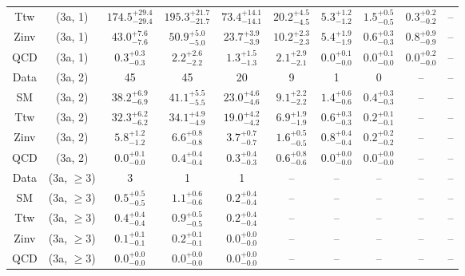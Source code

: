 \begin{table}[h!]
{\begin{tabular}{cccccccccc}
	Ttw & (3a, 1) & $174.5^{+ 29.4 }_{- 29.4 }$ & $195.3^{+ 21.7 }_{- 21.7 }$ & $73.4^{+ 14.1 }_{- 14.1 }$ & $20.2^{+ 4.5 }_{- 4.5 }$ & $5.3^{+ 1.2 }_{- 1.2 }$ & $1.5^{+ 0.5 }_{- 0.5 }$ & $0.3^{+ 0.2 }_{- 0.2 }$ & -- \\[0.5ex] 
	Zinv & (3a, 1) & $43.0^{+ 7.6 }_{- 7.6 }$ & $50.9^{+ 5.0 }_{- 5.0 }$ & $23.7^{+ 3.9 }_{- 3.9 }$ & $10.2^{+ 2.3 }_{- 2.3 }$ & $5.4^{+ 1.9 }_{- 1.9 }$ & $0.6^{+ 0.3 }_{- 0.3 }$ & $0.8^{+ 0.9 }_{- 0.9 }$ & -- \\[0.5ex] 
	QCD & (3a, 1) & $0.3^{+ 0.3 }_{- 0.3 }$ & $2.2^{+ 2.6 }_{- 2.2 }$ & $1.3^{+ 1.5 }_{- 1.3 }$ & $2.1^{+ 2.9 }_{- 2.1 }$ & $0.0^{+ 0.1 }_{- 0.0 }$ & $0.0^{+ 0.1 }_{- 0.0 }$ & $0.0^{+ 0.2 }_{- 0.0 }$ & -- \\[0.5ex] 
	Data & (3a, 2) & 45 & 45 & 20 & 9 & 1 & 0 & -- & -- \\[0.5ex] 
	SM & (3a, 2) & $38.2^{+ 6.9 }_{- 6.9 }$ & $41.1^{+ 5.5 }_{- 5.5 }$ & $23.0^{+ 4.6 }_{- 4.6 }$ & $9.1^{+ 2.2 }_{- 2.2 }$ & $1.4^{+ 0.6 }_{- 0.6 }$ & $0.4^{+ 0.3 }_{- 0.3 }$ & -- & -- \\[0.5ex] 
	Ttw & (3a, 2) & $32.3^{+ 6.2 }_{- 6.2 }$ & $34.1^{+ 4.9 }_{- 4.9 }$ & $19.0^{+ 4.2 }_{- 4.2 }$ & $6.9^{+ 1.9 }_{- 1.9 }$ & $0.6^{+ 0.3 }_{- 0.3 }$ & $0.2^{+ 0.1 }_{- 0.1 }$ & -- & -- \\[0.5ex] 
	Zinv & (3a, 2) & $5.8^{+ 1.2 }_{- 1.2 }$ & $6.6^{+ 0.8 }_{- 0.8 }$ & $3.7^{+ 0.7 }_{- 0.7 }$ & $1.6^{+ 0.5 }_{- 0.5 }$ & $0.8^{+ 0.4 }_{- 0.4 }$ & $0.2^{+ 0.2 }_{- 0.2 }$ & -- & -- \\[0.5ex] 
	QCD & (3a, 2) & $0.0^{+ 0.1 }_{- 0.0 }$ & $0.4^{+ 0.4 }_{- 0.4 }$ & $0.3^{+ 0.4 }_{- 0.3 }$ & $0.6^{+ 0.8 }_{- 0.6 }$ & $0.0^{+ 0.0 }_{- 0.0 }$ & $0.0^{+ 0.0 }_{- 0.0 }$ & -- & -- \\[0.5ex] 
	Data & (3a, $\ge3$) & 3 & 1 & 1 & -- & -- & -- & -- & -- \\[0.5ex] 
	SM & (3a, $\ge3$) & $0.5^{+ 0.5 }_{- 0.5 }$ & $1.1^{+ 0.6 }_{- 0.6 }$ & $0.2^{+ 0.4 }_{- 0.4 }$ & -- & -- & -- & -- & -- \\[0.5ex] 
	Ttw & (3a, $\ge3$) & $0.4^{+ 0.4 }_{- 0.4 }$ & $0.9^{+ 0.5 }_{- 0.5 }$ & $0.2^{+ 0.4 }_{- 0.4 }$ & -- & -- & -- & -- & -- \\[0.5ex] 
	Zinv & (3a, $\ge3$) & $0.1^{+ 0.1 }_{- 0.1 }$ & $0.2^{+ 0.1 }_{- 0.1 }$ & $0.0^{+ 0.0 }_{- 0.0 }$ & -- & -- & -- & -- & -- \\[0.5ex] 
	QCD & (3a, $\ge3$) & $0.0^{+ 0.0 }_{- 0.0 }$ & $0.0^{+ 0.0 }_{- 0.0 }$ & $0.0^{+ 0.0 }_{- 0.0 }$ & -- & -- & -- & -- & -- \\[0.5ex] 

\end{tabular}}
\end{table}
